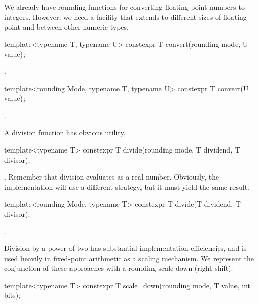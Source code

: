\begin{addedblock}
We already have rounding functions for converting floating-point numbers to integers. However, we need a facility that extends to different sizes of floating-point and between other numeric types.

\begin{itemdecl}
template<typename T, typename U>
constexpr T convert(rounding mode, U value);
\end{itemdecl}

\begin{itemdescr}
\returns {}.
\end{itemdescr}

\begin{itemdecl}
template<rounding Mode, typename T, typename U>
constexpr T convert(U value);
\end{itemdecl}

\begin{itemdescr}
\returns {}.
\end{itemdescr}

A division function has obvious utility.

\begin{itemdecl}
template<typename T>
constexpr T divide(rounding mode, T dividend, T divisor);
\end{itemdecl}

\begin{itemdescr}
\returns {}. Remember that division evaluates as a real number. Obviously, the implementation will use a different strategy, but it must yield the same result.
\end{itemdescr}

\begin{itemdecl}
template<rounding Mode, typename T>
constexpr T divide(T dividend, T divisor);
\end{itemdecl}

\begin{itemdescr}
\returns {}.
\end{itemdescr}

Division by a power of two has substantial implementation efficiencies, and is used heavily in fixed-point arithmetic as a scaling mechanism. We represent the conjunction of these approaches with a rounding scale down (right shift).

\begin{itemdecl}
template<typename T>
constexpr T scale_down(rounding mode, T value, int bits);
\end{itemdecl}


\end{addedblock}
